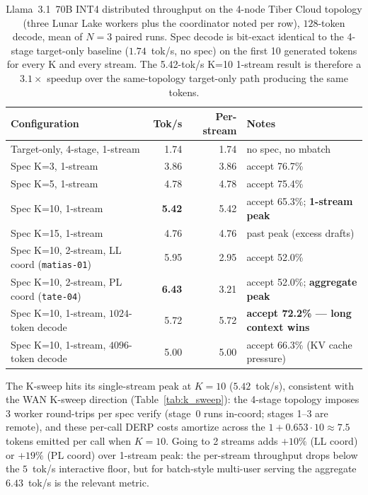 \documentclass[11pt]{article}
\begin{document}
\begin{table}[ht]
\centering
\caption{Llama~3.1~70B INT4 distributed throughput on the 4-node Tiber Cloud topology (three Lunar Lake workers plus the coordinator noted per row), $128$-token decode, mean of $N\!=\!3$ paired runs. Spec decode is bit-exact identical to the 4-stage target-only baseline ($1.74$~tok/s, no spec) on the first 10 generated tokens for every K and every stream. The 5.42-tok/s K=10 1-stream result is therefore a $3.1\times$ speedup over the same-topology target-only path producing the same tokens.}
\label{tab:llama70b}
\small
\setlength{\tabcolsep}{4pt}
\begin{tabular}{@{}lrrl@{}}
\toprule
Configuration & Tok/s & Per-stream & Notes \\
\midrule
Target-only, 4-stage, 1-stream & 1.74 & 1.74 & no spec, no mbatch \\
Spec K=3, 1-stream & 3.86 & 3.86 & accept 76.7\% \\
Spec K=5, 1-stream & 4.78 & 4.78 & accept 75.4\% \\
Spec K=10, 1-stream & \textbf{5.42} & 5.42 & accept 65.3\%; \textbf{1-stream peak} \\
Spec K=15, 1-stream & 4.76 & 4.76 & past peak (excess drafts) \\
Spec K=10, 2-stream, LL coord (\texttt{matias-01}) & 5.95 & 2.95 & accept 52.0\% \\
Spec K=10, 2-stream, PL coord (\texttt{tate-04}) & \textbf{6.43} & 3.21 & accept 52.0\%; \textbf{aggregate peak} \\
\midrule
Spec K=10, 1-stream, $1024$-token decode & 5.72 & 5.72 & \textbf{accept 72.2\% --- long context wins} \\
Spec K=10, 1-stream, $4096$-token decode & 5.00 & 5.00 & accept 66.3\% (KV cache pressure) \\
\bottomrule
\end{tabular}
\end{table}

The K-sweep hits its single-stream peak at $K\!=\!10$ ($5.42$~tok/s), consistent with the WAN K-sweep direction (Table~\ref{tab:k_sweep}): the 4-stage topology imposes 3 worker round-trips per spec verify (stage~0 runs in-coord; stages 1--3 are remote), and these per-call DERP costs amortize across the $1\!+\!0.653 \cdot 10 \approx 7.5$ tokens emitted per call when $K\!=\!10$. Going to 2 streams adds $+10\%$ (LL coord) or $+19\%$ (PL coord) over 1-stream peak: the per-stream throughput drops below the $5$~tok/s interactive floor, but for batch-style multi-user serving the aggregate $6.43$~tok/s is the relevant metric.
\end{document}
